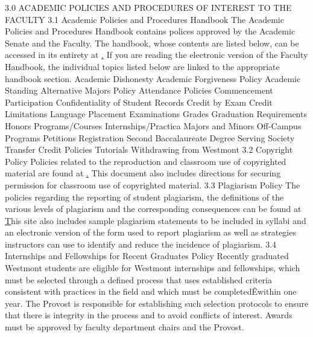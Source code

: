 \documentclass[letterpaper, 11pt]{article}
\begin{document}
	3.0 ACADEMIC POLICIES AND PROCEDURES OF INTEREST TO THE FACULTY
	3.1 Academic Policies and Procedures Handbook
	The Academic Policies and Procedures Handbook contains polices approved by
	the Academic Senate and the Faculty.  The handbook, whose contents are listed
	below, can be accessed in its entirety at
	\href{http://cgi2.westmont.edu/publications/academic_policies/} .
	If you are reading the electronic version of the Faculty Handbook, the individual topics listed below are linked to the appropriate handbook section.
	Academic Dishonesty
	Academic Forgiveness Policy
	Academic Standing
	Alternative Majors Policy
	Attendance Policies
	Commencement Participation
	Confidentiality of Student Records
	Credit by Exam
	Credit Limitations
	Language Placement
	Examinations
	Grades
	Graduation Requirements
	Honors Programs/Courses
	Internships/Practica
	Majors and Minors
	Off-Campus Programs
	Petitions
	Registration
	Second Baccalaureate Degree
	Serving Society
	Transfer Credit Policies
	Tutorials
	Withdrawing from Westmont
	3.2 Copyright Policy
	Policies related to the reproduction and classroom use of copyrighted
	material are found at
	\href{http://www.westmont.edu/_faculty_staff/pages/policies/copyright_policy/index.html}.
	This document also includes directions for securing permission for classroom use of copyrighted material.
	3.3 Plagiarism Policy
	The policies regarding the reporting of student plagiarism, the definitions
	of the various levels of plagiarism and the corresponding consequences can be
	found at
	\href{http://www.westmont.edu/_academics/pages/provost/curriculum/plagiarism/}
	This site also includes sample plagiarism statements to be included in syllabi and an electronic version of the form used to report plagiarism as well as strategies instructors can use to identify and reduce the incidence of plagiarism.
	3.4 Internships and Fellowships for Recent Graduates Policy
	Recently graduated Westmont students are eligible for Westmont internships and fellowships, which must be selected through a defined process that uses established criteria consistent with practices in the field and which must be completedÊwithin one year. The Provost is responsible for establishing such selection protocols to ensure that there is integrity in the process and to avoid conflicts of interest. Awards must be approved by faculty department chairs and the Provost.
\end{document}
